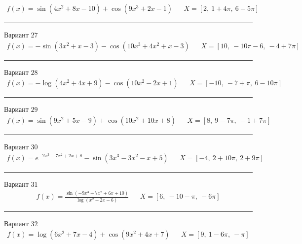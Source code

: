 \documentclass[11pt]{report}
\begin{document}
\begin{align*}
    f(x) = \sin{\left(4 x^{2} + 8 x - 10 \right)} + \cos{\left(9 x^{3} + 2 x - 1 \right)} && X = \left[ 2, \  1 + 4 \pi, \  6 - 5 \pi\right]
\end{align*}
\begin{center}
    \noindent\rule{8cm}{0.4pt}
\end{center}
Вариант \(27\)
\begin{align*}
    f(x) = - \sin{\left(3 x^{2} + x - 3 \right)} - \cos{\left(10 x^{3} + 4 x^{2} + x - 3 \right)} && X = \left[ 10, \  - 10 \pi - 6, \  -4 + 7 \pi\right]
\end{align*}
\begin{center}
    \noindent\rule{8cm}{0.4pt}
\end{center}
Вариант \(28\)
\begin{align*}
    f(x) = - \log{\left(4 x^{2} + 4 x + 9 \right)} - \cos{\left(10 x^{2} - 2 x + 1 \right)} && X = \left[ -10, \  -7 + \pi, \  6 - 10 \pi\right]
\end{align*}
\begin{center}
    \noindent\rule{8cm}{0.4pt}
\end{center}
Вариант \(29\)
\begin{align*}
    f(x) = \sin{\left(9 x^{2} + 5 x - 9 \right)} + \cos{\left(10 x^{2} + 10 x + 8 \right)} && X = \left[ 8, \  9 - 7 \pi, \  -1 + 7 \pi\right]
\end{align*}
\begin{center}
    \noindent\rule{8cm}{0.4pt}
\end{center}
Вариант \(30\)
\begin{align*}
    f(x) = e^{- 2 x^{3} - 7 x^{2} + 2 x + 8} - \sin{\left(3 x^{3} - 3 x^{2} - x + 5 \right)} && X = \left[ -4, \  2 + 10 \pi, \  2 + 9 \pi\right]
\end{align*}
\begin{center}
    \noindent\rule{8cm}{0.4pt}
\end{center}
Вариант \(31\)
\begin{align*}
    f(x) = \frac{\sin{\left(- 9 x^{3} + 7 x^{2} + 6 x + 10 \right)}}{\log{\left(x^{2} - 2 x - 6 \right)}} && X = \left[ 6, \  -10 - \pi, \  - 6 \pi\right]
\end{align*}
\begin{center}
    \noindent\rule{8cm}{0.4pt}
\end{center}
Вариант \(32\)
\begin{align*}
    f(x) = \log{\left(6 x^{2} + 7 x - 4 \right)} + \cos{\left(9 x^{2} + 4 x + 7 \right)} && X = \left[ 9, \  1 - 6 \pi, \  - \pi\right]
\end{align*}
\end{document}
